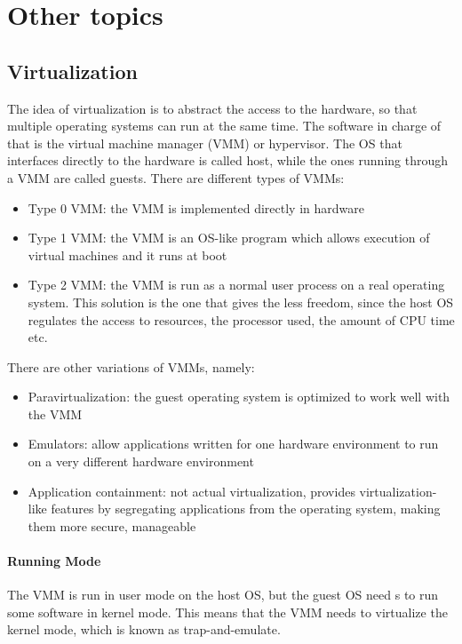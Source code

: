 \chapter{Other topics}
\section{Virtualization}
The idea of virtualization is to abstract the access to the hardware, so that multiple operating systems can run at the same time. The software in charge of that is the virtual machine manager (VMM) or hypervisor. The OS that interfaces directly to the hardware is called host, while the ones running through a VMM are called guests. There are different types of VMMs:
\begin{itemize}
    \item Type 0 VMM: the VMM is implemented directly in hardware
    \item Type 1 VMM: the VMM is an OS-like program which allows execution of virtual machines and it runs at boot
    \item Type 2 VMM: the VMM is run as a normal user process on a real operating system. This solution is the one that gives the less freedom, since the host OS regulates the access to resources, the processor used, the amount of CPU time etc.
\end{itemize}

There are other variations of VMMs, namely:
\begin{itemize}
    \item Paravirtualization: the guest operating system is optimized to work well with the VMM
    \item Emulators: allow applications written for one hardware
    environment to run on a very different hardware environment
    \item Application containment: not actual virtualization, provides virtualization-like features by segregating applications from the operating system, making them more secure,
    manageable
\end{itemize}

\subsubsection{Running Mode}
The VMM is run in user mode on the host OS, but the guest OS need s to run some software in kernel mode. This means that the VMM needs to virtualize the kernel mode, which is known as trap-and-emulate.

